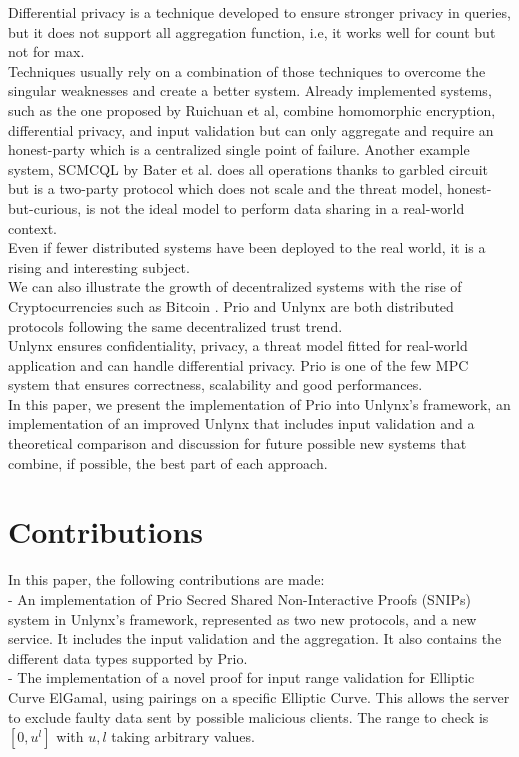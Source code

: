 \documentclass{article}
\begin{document}
Differential privacy is a technique developed to ensure stronger privacy in queries, but it does not support all aggregation function, i.e, it works well for count but not for max.\\
Techniques usually rely on a combination of those techniques to overcome the singular weaknesses and create a better system. Already implemented systems, such as the one proposed by Ruichuan et al, \cite{ref1} combine homomorphic encryption, differential privacy, and input validation but can only aggregate and require an honest-party which is a centralized single point of failure. Another example system, SCMCQL by Bater et al. \cite{ref2} does all operations thanks to garbled circuit but is a two-party protocol which does not scale and the threat model, honest-but-curious, is not the ideal model to perform data sharing in a real-world context.\\
Even if fewer distributed systems have been deployed to the real world, it is a rising and interesting subject.\\
We can also illustrate the growth of decentralized systems with the rise of Cryptocurrencies such as Bitcoin \cite{bitcoin}. Prio and Unlynx are both distributed protocols following the same decentralized trust trend.\\
Unlynx ensures confidentiality, privacy, a threat model fitted for real-world application and can handle differential privacy. Prio is one of the few MPC system that ensures correctness, scalability and good performances.\\
In this paper, we present the implementation of Prio into Unlynx's framework, an implementation of an improved Unlynx that includes input validation and a theoretical comparison and discussion for future possible new systems that combine, if possible, the best part of each approach.
	
\section{Contributions}
In this paper, the following contributions are made:\\
- An implementation of Prio Secred Shared Non-Interactive Proofs (SNIPs) system in Unlynx's framework, represented as two new protocols, and a new service. It includes the input validation and the aggregation. It also contains the different data types supported by Prio.\\

- The implementation of a novel proof for input range validation for Elliptic Curve ElGamal, using pairings on a specific Elliptic Curve. This allows the server to exclude faulty data sent by possible malicious clients. The range to check is $[0,u^l]$ with $u,l$ taking arbitrary values.\\
\end{document}
